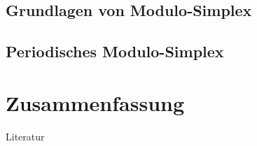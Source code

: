 \documentclass[accentcolor = tud11b, colorbacktitle, landscape, german, presentation]{tudbeamer}
\begin{document}
		\subsection{Grundlagen von Modulo-Simplex}
		
		\subsection{Periodisches Modulo-Simplex}
	
	\section{Zusammenfassung}

	\begin{frame}{Literatur}
		
	\end{frame}
\end{document}
